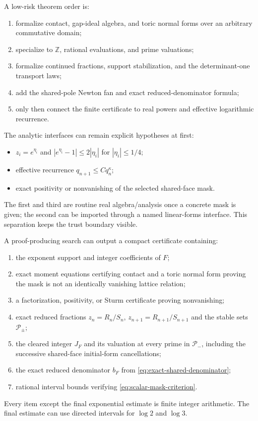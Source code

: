 \documentclass[11pt,oneside]{article}
\theoremstyle{definition}
\theoremstyle{remark}
\newcommand{\Z}{\mathbb Z}
\begin{document}
A low-risk theorem order is:
\begin{enumerate}
\item formalize contact, gap-ideal algebra, and toric normal forms over an arbitrary
  commutative domain;
\item specialize to $\Z$, rational evaluations, and prime valuations;
\item formalize continued fractions, support stabilization, and the determinant-one transport
  laws;
\item add the shared-pole Newton fan and exact reduced-denominator formula;
\item only then connect the finite certificate to real powers and effective logarithmic
  recurrence.
\end{enumerate}

The analytic interfaces can remain explicit hypotheses at first:
\begin{itemize}
\item $z_i=e^{\eta_i}$ and $|e^{\eta_i}-1|\le2|\eta_i|$ for $|\eta_i|\le1/4$;
\item effective recurrence $q_{n+1}\le Cq_n^\kappa$;
\item exact positivity or nonvanishing of the selected shared-face mask.
\end{itemize}
The first and third are routine real algebra/analysis once a concrete mask is given; the
second can be imported through a named linear-forms interface.  This separation keeps the
trust boundary visible.

A proof-producing search can output a compact certificate containing:
\begin{enumerate}
\item the exponent support and integer coefficients of $F$;
\item exact moment equations certifying contact and a toric normal form proving the mask is
  not an identically vanishing lattice relation;
\item a factorization, positivity, or Sturm certificate proving nonvanishing;
\item exact reduced fractions $z_n=R_n/S_n$, $z_{n+1}=R_{n+1}/S_{n+1}$ and the stable sets
  $\mathcal P_\pm$;
\item the cleared integer $J_F$ and its valuation at every prime in $\mathcal P_-$, including
  the successive shared-face initial-form cancellations;
\item the exact reduced denominator $b_F$ from \eqref{eq:exact-shared-denominator};
\item rational interval bounds verifying \eqref{eq:scalar-mask-criterion}.
\end{enumerate}
Every item except the final exponential estimate is finite integer arithmetic.  The final
estimate can use directed intervals for $\log2$ and $\log3$.
\end{document}
